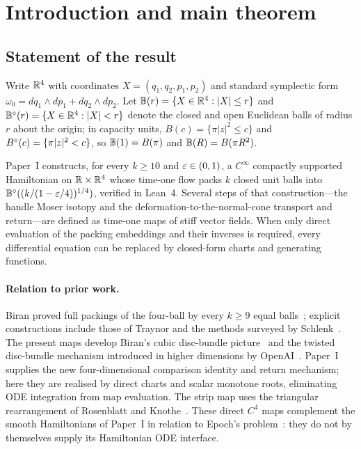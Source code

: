 \section{Introduction and main theorem}\label{sec:intro}

\subsection{Statement of the result}\label{sec:intro-thm}

Write $\mathbb{R}^4$ with coordinates $X=(q_1,q_2,p_1,p_2)$ and standard symplectic form
$\omega_0=dq_1\wedge dp_1+dq_2\wedge dp_2$. Let $\mathbb{B}(r)=\{X\in\mathbb{R}^4:|X|\le r\}$ and
$\mathbb{B}^{\circ}(r)=\{X\in\mathbb{R}^4:|X|<r\}$ denote the closed and open Euclidean balls of radius $r$ about the origin; in
capacity units, $B(c)=\{\pi|z|^2\le c\}$ and $B^{\circ}(c)=\{\pi|z|^2<c\}$, so $\mathbb{B}(1)=B(\pi)$ and $\mathbb{B}(R)=B(\pi R^2)$.

Paper~I \cite{SongP1} constructs, for every $k\ge10$ and $\varepsilon\in(0,1)$, a $C^\infty$ compactly supported Hamiltonian
on $\mathbb{R}\times\mathbb{R}^4$ whose time-one flow packs $k$ closed unit balls into $\mathbb{B}^{\circ}((k/(1-\varepsilon/4))^{1/4})$, verified in
Lean~4. Several steps of that construction---the handle Moser isotopy and the deformation-to-the-normal-cone transport
and return---are defined as time-one maps of stiff vector fields. When only direct evaluation of the packing embeddings
and their inverses is required, every differential equation can be replaced by closed-form charts and generating
functions.

\paragraph{Relation to prior work.}
Biran proved full packings of the four-ball by every $k\ge9$ equal balls~\cite{Biran1997}; explicit constructions
include those of Traynor and the methods surveyed by Schlenk~\cite{Traynor1995,Schlenk2018}.
The present maps develop Biran's cubic disc-bundle picture~\cite{Biran2001} and the twisted disc-bundle mechanism
introduced in higher dimensions by OpenAI~\cite{OpenAI2026}. Paper~I supplies the new four-dimensional comparison
identity and return mechanism; here they are realised by direct charts and scalar monotone roots, eliminating ODE
integration from map evaluation. The strip map uses the triangular rearrangement of Rosenblatt and
Knothe~\cite{Rosenblatt1952,Knothe1957}. These direct $C^4$ maps complement the smooth Hamiltonians of Paper~I in
relation to Epoch's problem~\cite{Epoch}: they do not by themselves supply its Hamiltonian ODE interface.

